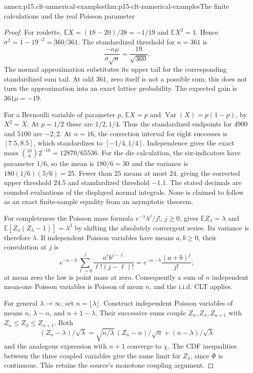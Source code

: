 \begin{annexitem}{annex:p15.clt-numerical-examples}{thm:p15-clt-numerical-examples}{The finite calculations and the real Poisson parameter}
\begin{proof}
For roulette,
\(\mathbb EX=(18-20)/38=-1/19\) and
\(\mathbb EX^2=1\). Hence
\(\sigma^2=1-19^{-2}=360/361\).
The standardized threshold for \(n=361\) is
\[
 \frac{-n\mu}{\sigma\sqrt n}
 =\frac{19}{\sqrt{360}}.
 \]
The normal approximation substitutes its upper tail for the
corresponding standardized sum tail. At odd \(361\), zero itself
is not a possible sum; this does not turn the approximation into
an exact lattice probability. The expected gain is \(361\mu=-19\).

For a Bernoulli variable of parameter \(p\),
\(\mathbb EX=p\) and
\(\operatorname{Var}(X)=p(1-p)\), by \(X^2=X\).
At \(p=1/2\) these are \(1/2,1/4\). Thus the standardized
endpoints for \(4900\) and \(5100\) are \(-2,2\).
At \(n=16\), the correction interval for eight successes is
\([7.5,8.5]\), which standardizes to \([-1/4,1/4]\).
Independence gives the exact mass
\(\binom{16}{8}2^{-16}=12870/65536\).
For the die calculation, the six-indicators have parameter \(1/6\),
so the mean is \(180/6=30\) and the variance is
\(180(1/6)(5/6)=25\).
Fewer than \(25\) means at most \(24\), giving the corrected
upper threshold \(24.5\) and standardized threshold \(-1.1\).
The stated decimals are rounded evaluations of the displayed
normal integrals. None is claimed to follow as an exact
finite-sample equality from an asymptotic theorem.

For completeness the Poisson mass formula
\(e^{-\lambda}\lambda^j/j!\), \(j\geq0\), gives
\(\mathbb EZ_\lambda=\lambda\) and
\(\mathbb E[Z_\lambda(Z_\lambda-1)]=\lambda^2\) by shifting
the absolutely convergent series. Its variance is therefore
\(\lambda\). If independent Poisson variables have means
\(a,b\geq0\), their convolution at \(j\) is
\[
 e^{-a-b}\sum_{\ell=0}^j
       \frac{a^\ell b^{j-\ell}}{\ell!(j-\ell)!}
 =e^{-a-b}\frac{(a+b)^j}{j!};
 \]
at mean zero the law is point mass at zero.
Consequently a sum of \(n\) independent mean-one Poisson
variables is Poisson of mean \(n\), and the i.i.d. CLT applies.

For general \(\lambda\to\infty\), set \(n=\lfloor\lambda\rfloor\).
Construct independent Poisson variables of means \(n\),
\(\lambda-n\), and \(n+1-\lambda\). Their successive sums
couple \(Z_n,Z_\lambda,Z_{n+1}\) with
\(Z_n\leq Z_\lambda\leq Z_{n+1}\).
Both
\[
 (Z_n-\lambda)/\sqrt\lambda
 =\sqrt{n/\lambda}\,(Z_n-n)/\sqrt n+(n-\lambda)/\sqrt\lambda
 \]
and the analogous expression with \(n+1\) converge to \(\chi\).
The CDF inequalities between the three coupled variables give
the same limit for \(Z_\lambda\), since \(\Phi\) is continuous.
This retains the source's monotone coupling argument.
\end{proof}
\end{annexitem}

